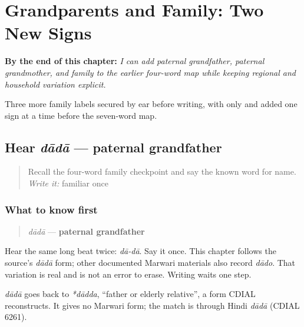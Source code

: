 
\chapter{Grandparents and Family: Two New Signs}
\label{ch:mw-family-seven}

\begin{chapteropening}
\textbf{By the end of this chapter:} \emph{I can add paternal grandfather, paternal grandmother, and family to the earlier four-word map while keeping regional and household variation explicit.}

Three more family labels secured by ear before writing, with only  and  added one sign at a time before the seven-word map.
\end{chapteropening}

\section[dādā]{Hear \emph{dādā} — paternal grandfather}

\label{lesson:MW-C08-hear-dada}



\begin{quote}
Recall the four-word family checkpoint and say the known word for name. \emph{Write it:} familiar \textbf{} once
\end{quote}

\subsection*{What to know first}
\begin{quote}
\emph{dādā} — \textbf{paternal grandfather}
\end{quote}

Hear the same long beat twice: \emph{dā-dā}. Say it once. This chapter follows the source's \emph{dādā} form; other documented Marwari materials also record \emph{dādo}. That variation is real and is not an error to erase. Writing waits one step.

\begin{cousinweb}
\emph{dādā} goes back to \emph{*dādda}, \textquotedblleft{}father or elderly relative\textquotedblright{}, a form CDIAL reconstructs. It gives no Marwari form; the match is through Hindi \emph{dādā} (CDIAL 6261).
\end{cousinweb}

